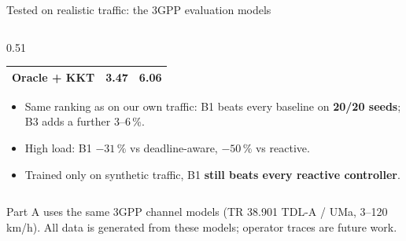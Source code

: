 \documentclass[aspectratio=169,10pt,xcolor={table,dvipsnames}]{beamer}
\newcommand{\gray}[1]{\textcolor{muted}{#1}}
\begin{document}
\begin{frame}{Tested on realistic traffic: the 3GPP evaluation models}
\begin{columns}[T]
\begin{column}{0.51\textwidth}
\begin{tabular}{lcc}
\midrule
\gray{Oracle + KKT} & \gray{3.47} & \gray{6.06} \\
\bottomrule
\end{tabular}
\vspace{0.3em}
\begin{itemize}\footnotesize
  \item Same ranking as on our own traffic: B1 beats every baseline on \textbf{20/20 seeds}; B3 adds a further 3--6\,\%.
  \item High load: B1 $-31\,\%$ vs deadline-aware, $-50\,\%$ vs reactive.
  \item Trained only on synthetic traffic, B1 \textbf{still beats every reactive controller}.
\end{itemize}
\end{column}
\end{columns}
{\tiny Part A uses the same 3GPP channel models (TR 38.901 TDL-A / UMa, 3--120\,km/h). All data is generated from these models; operator traces are future work.}
\end{frame}
\end{document}
